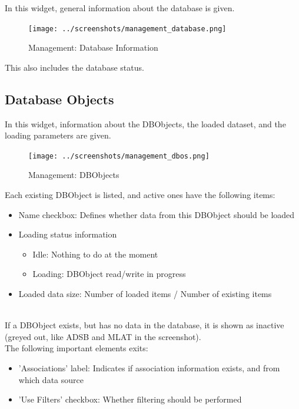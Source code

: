 In this widget, general information about the database is given. 

\begin{figure}[H]
  \center
    \texttt{[image: ../screenshots/management\_database.png]}
  \caption{Management: Database Information}
\end{figure}

This also includes the database status.

\subsection{Database Objects}
\label{sec:management_dbos}

In this widget, information about the DBObjects, the loaded dataset, and the loading parameters are given.

\begin{figure}[H]
  \center
    \texttt{[image: ../screenshots/management\_dbos.png]}
  \caption{Management: DBObjects}
\end{figure}

Each existing DBObject is listed, and active ones have the following items:

\begin{itemize}
 \item Name checkbox: Defines whether data from this DBObject should be loaded
 \item Loading status information
  \begin{itemize}
  \item Idle: Nothing to do at the moment
  \item Loading: DBObject read/write in progress
  \end{itemize}
 \item Loaded data size: Number of loaded items / Number of existing items
\end{itemize}
\ \\

If a DBObject exists, but has no data in the database, it is shown as inactive (greyed out, like ADSB and MLAT in the screenshot).\\

The following important elements exits:
\begin{itemize}
 \item 'Associations' label: Indicates if association information exists, and from which data source
 \item 'Use Filters' checkbox: Whether filtering should be performed
\end{itemize}
\ \\

